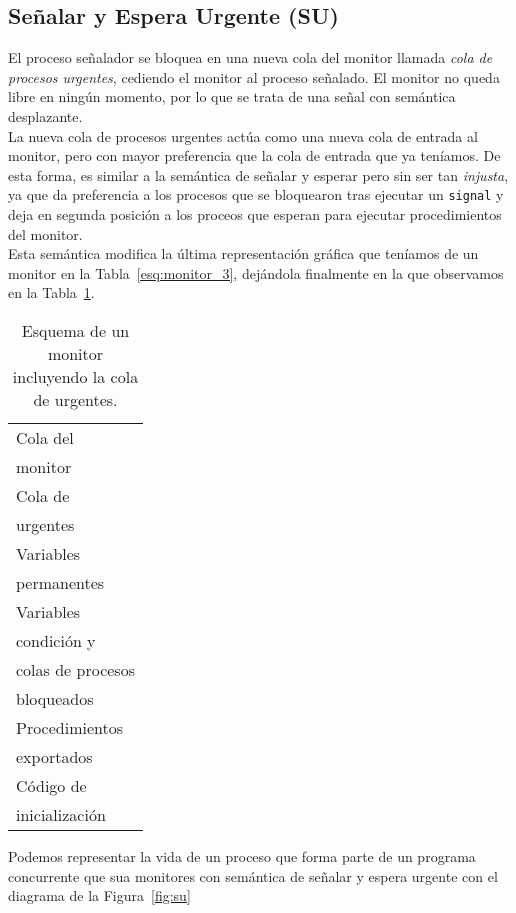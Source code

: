 \subsection{Señalar y Espera Urgente (SU)}
El proceso señalador se bloquea en una nueva cola del monitor llamada \textit{cola de procesos urgentes}, cediendo el monitor al proceso señalado. El monitor no queda libre en ningún momento, por lo que se trata de una señal con semántica desplazante.\\

La nueva cola de procesos urgentes actúa como una nueva cola de entrada al monitor, pero con mayor preferencia que la cola de entrada que ya teníamos. De esta forma, es similar a la semántica de señalar y esperar pero sin ser tan \textit{injusta}, ya que da preferencia a los procesos que se bloquearon tras ejecutar un \verb|signal| y deja en segunda posición a los proceos que esperan para ejecutar procedimientos del monitor.\\

Esta semántica modifica la última representación gráfica que teníamos de un monitor en la Tabla~\ref{esq:monitor_3}, dejándola finalmente en la que observamos en la Tabla~\ref{esq:monitor_4}.

\begin{table}[H]
\centering
\begin{tabular}{|l|}
\hline
Cola del\\
monitor \\
\hline
Cola de\\
urgentes \\
\hline
Variables \\
permanentes \\
\hline
Variables \\
condición y\\
colas de procesos\\
bloqueados\\
\hline
Procedimientos \\
exportados \\
\hline
Código de \\ 
inicialización \\
\hline
\end{tabular}
\caption{Esquema de un monitor incluyendo la cola de urgentes.}
\label{esq:monitor_4}
\end{table}

Podemos representar la vida de un proceso que forma parte de un programa concurrente que sua monitores con semántica de señalar y espera urgente con el diagrama de la Figura~\ref{fig:su}

